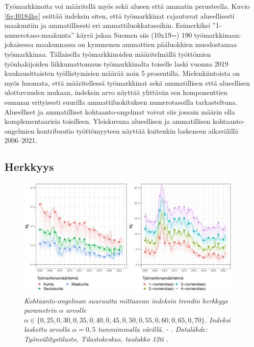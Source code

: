 \documentclass[12pt]{article}
\newcommand{\lastdatamonth}{\unskip}
\newcommand{\firstdatamonth}{\unskip}
\newcommand{\newcaption}[1]{\caption{\textit{\footnotesize{#1}}}}
\begin{document}
Työmarkkinoita voi määritellä myös sekä alueen että ammatin perusteella. Kuvio \ref{fig:l0184hg} esittää indeksin siten, että työmarkkinat rajautuvat alueellisesti maakuntiin ja ammatillisesti eri ammattiluokkatasoihin. Esimerkiksi ”1-numerotaso-maakunta” käyrä jakaa Suomen siis (10x19=) 190 työmarkkinaan: jokaisessa maakunnassa on kymmenen ammattien pääluokkien muodostamaa työmarkkinaa. Tällaisella työmarkkinoiden määritelmällä työttömien työnhakijoiden liikkumattomuus työmarkkinalta toiselle laski vuonna 2019 kuukausittaisten työllistymisien määrää noin 5 prosentilla. Mielenkiintoista on myös huomata, että määritellessä työmarkkinat sekä ammatillisen että alueellisen ulottuvuuden mukaan, indeksin arvo näyttää ylittävän sen komponenttien summan erityisesti suurilla ammattiluokituksen numerotasoilla tarkasteltuna. Alueelliset ja ammatilliset kohtaanto-ongelmat voivat siis jossain määrin olla komplementaarisia toisilleen. Yleiskuvana alueellisen ja ammatillisen kohtaanto-ongelmien kontribuutio työttömyyteen näyttää kuitenkin laskeneen aikavälillä 2006–2021.

\subsection{Herkkyys} \label{section:herkkyys}
\begin{figure}
\centering
\includegraphics[scale = 0.55]{../kuviot/herkkyys_a.pdf}
    \newcaption{Kohtaanto-ongelman suuruutta mittaavan indeksin trendin herkkyys parametrin $\alpha$ arvolle $\alpha \in \{0,25, 0,30, 0,35, 0,40, 0,45, 0,50, 0,55, 0,60, 0,65, 0,70\}$. Indeksi laskettu arvolla $\alpha = 0,5$ tummimmalla värillä. \protect \firstdatamonth \phantom{} - \protect\lastdatamonth. Datalähde: Työnvälitystilasto, Tilastokeskus, taulukko 12ti \protect \cite{svt2011}.}
   \label{fig:ldsdfhg}
\end{figure}
\end{document}
